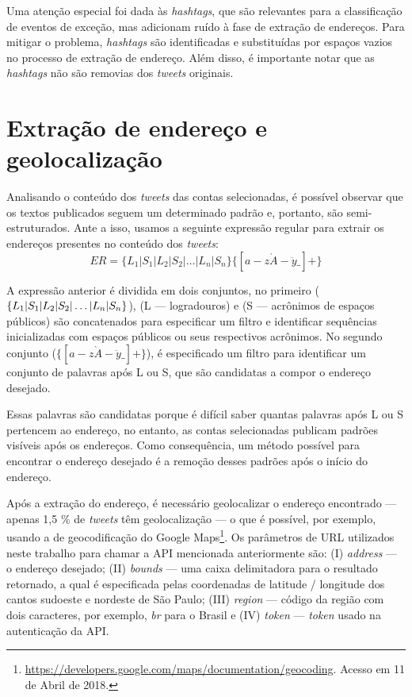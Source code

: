 \documentclass[
	12pt,				%
	oneside,			%
	a4paper,			%
	english,			%
	brazil				%
	]{abntex2ppgsi}
\begin{document}
{{{Uma atenção especial foi dada às \textit{hashtags}, que são relevantes para a classificação de eventos de exceção, mas adicionam ruído à fase de extração de endereços. Para mitigar o problema, \textit{hashtags} são identificadas e substituídas por espaços vazios no processo de extração de endereço. Além disso, é importante notar que as \textit{hashtags} não são removias dos \textit{tweets} originais.

\section{Extração de endereço e geolocalização}

Analisando o conteúdo dos \textit{tweets} das contas selecionadas, é possível observar que os textos publicados seguem um determinado padrão e, portanto, são semi-estruturados. Ante a isso, usamos a seguinte expressão regular para extrair os endereços presentes no conteúdo dos \textit{tweets}:
%
\begin{equation}
ER = \lbrace L_1 | S_1 | L_2 | S_2 | \dots | L_n | S_n \rbrace \lbrace [a-z\grave{A}-\ddot{y}\_] + \rbrace
\end{equation}

A expressão anterior é dividida em dois conjuntos, no primeiro ($\lbrace L_1 | S_1 | L_2 | S_2 | \newline \dots | L_n | S_n \rbrace $), (L --- logradouros) e (S --- acrônimos de espaços públicos) são concatenados para especificar um filtro e identificar sequências inicializadas com espaços públicos ou seus respectivos acrônimos. No segundo conjunto ($\lbrace [a-z\grave{A}-\ddot{y}\_] + \rbrace $), é especificado um filtro para identificar um conjunto de palavras após L ou S, que são candidatas a compor o endereço desejado.

Essas palavras são candidatas porque é difícil saber quantas palavras após L ou S pertencem ao endereço, no entanto, as contas selecionadas publicam padrões visíveis após os endereços. Como consequência, um método possível para encontrar o endereço desejado é a remoção desses padrões após o início do endereço.

Após a extração do endereço, é necessário geolocalizar o endereço encontrado --- apenas 1,5 \% de \textit {tweets} têm geolocalização \cite{niu2016community} --- o que é possível, por exemplo, usando a  de geocodificação do Google Maps\footnote {\url {https://developers.google.com/maps/documentation/geocoding}. Acesso em 11 de Abril de 2018.}. Os parâmetros de URL utilizados neste trabalho para chamar a API mencionada anteriormente são: (I) \emph {address} --- o endereço desejado; (II) \emph {bounds} --- uma caixa delimitadora para o resultado retornado, a qual é especificada pelas coordenadas de latitude / longitude dos cantos sudoeste e nordeste de São Paulo; (III) \emph {region} --- código da região com dois caracteres, por exemplo, \textit{br} para o Brasil e (IV) \emph {token} --- \textit{token} usado na autenticação da API.

}}}
\end{document}
